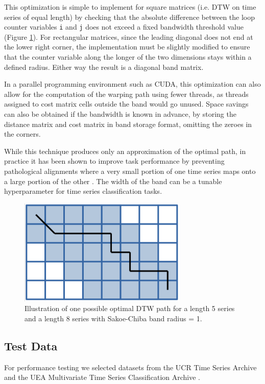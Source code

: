 \documentclass[12pt, letterpaper]{article}
\begin{document}
This optimization is simple to implement for square matrices (i.e. DTW on time
series of equal length) by checking that the absolute difference between the
loop counter variables \verb|i| and \verb|j| does not exceed a fixed bandwidth
threshold value (Figure \ref{sakoe_chiba}). For rectangular matrices, since the
leading diagonal does not end at the lower right corner, the implementation must
be slightly modified to ensure that the counter variable along the longer of the
two dimensions stays within a defined radius. Either way the result is a
diagonal band matrix.

In a parallel programming environment such as CUDA, this optimization can also
allow for the computation of the warping path using fewer threads, as threads
assigned to cost matrix cells outside the band would go unused. Space savings
can also be obtained if the bandwidth is known in advance, by storing the
distance matrix and cost matrix in band storage format, omitting the zeroes
in the corners.

While this technique produces only an approximation of the optimal path, in
practice it has been shown to improve task performance by preventing
pathological alignments where a very small portion of one time series maps onto
a large portion of the other \cite{keogh_exact_2002}. The width of the band
can be a tunable hyperparameter for time series classification tasks.

\begin{figure}[htbp]
\includegraphics[height=2in]{img/sakoe_chiba.png}
\centering
\caption{Illustration of one possible optimal DTW path for a length 5 series and
a length 8 series with Sakoe-Chiba band radius = 1.}
\label{sakoe_chiba}
\end{figure}


\subsection{Test Data}

For performance testing we selected datasets from the UCR Time Series Archive
\cite{dau_ucr_2019} and the UEA Multivariate Time Series Classification Archive
\cite{bagnall_uea_2018}.
\end{document}
